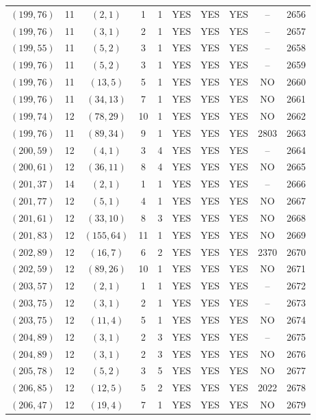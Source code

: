 \begin{longtable}{|c|c|c|c|c|c|c|c|c|c|}
$(199, 76)$ & 11 & $(2, 1)$ & 1 & 1 & YES & YES & YES & -- & 2656\\
$(199, 76)$ & 11 & $(3, 1)$ & 2 & 1 & YES & YES & YES & -- & 2657\\
$(199, 55)$ & 11 & $(5, 2)$ & 3 & 1 & YES & YES & YES & -- & 2658\\
$(199, 76)$ & 11 & $(5, 2)$ & 3 & 1 & YES & YES & YES & -- & 2659\\
$(199, 76)$ & 11 & $(13, 5)$ & 5 & 1 & YES & YES & YES & NO & 2660\\
$(199, 76)$ & 11 & $(34, 13)$ & 7 & 1 & YES & YES & YES & NO & 2661\\
$(199, 74)$ & 12 & $(78, 29)$ & 10 & 1 & YES & YES & YES & NO & 2662\\
$(199, 76)$ & 11 & $(89, 34)$ & 9 & 1 & YES & YES & YES & 2803 & 2663\\
$(200, 59)$ & 12 & $(4, 1)$ & 3 & 4 & YES & YES & YES & -- & 2664\\
$(200, 61)$ & 12 & $(36, 11)$ & 8 & 4 & YES & YES & YES & NO & 2665\\
$(201, 37)$ & 14 & $(2, 1)$ & 1 & 1 & YES & YES & YES & -- & 2666\\
$(201, 77)$ & 12 & $(5, 1)$ & 4 & 1 & YES & YES & YES & NO & 2667\\
$(201, 61)$ & 12 & $(33, 10)$ & 8 & 3 & YES & YES & YES & NO & 2668\\
$(201, 83)$ & 12 & $(155, 64)$ & 11 & 1 & YES & YES & YES & NO & 2669\\
$(202, 89)$ & 12 & $(16, 7)$ & 6 & 2 & YES & YES & YES & 2370 & 2670\\
$(202, 59)$ & 12 & $(89, 26)$ & 10 & 1 & YES & YES & YES & NO & 2671\\
$(203, 57)$ & 12 & $(2, 1)$ & 1 & 1 & YES & YES & YES & -- & 2672\\
$(203, 75)$ & 12 & $(3, 1)$ & 2 & 1 & YES & YES & YES & -- & 2673\\
$(203, 75)$ & 12 & $(11, 4)$ & 5 & 1 & YES & YES & YES & NO & 2674\\
$(204, 89)$ & 12 & $(3, 1)$ & 2 & 3 & YES & YES & YES & -- & 2675\\
$(204, 89)$ & 12 & $(3, 1)$ & 2 & 3 & YES & YES & YES & NO & 2676\\
$(205, 78)$ & 12 & $(5, 2)$ & 3 & 5 & YES & YES & YES & NO & 2677\\
$(206, 85)$ & 12 & $(12, 5)$ & 5 & 2 & YES & YES & YES & 2022 & 2678\\
$(206, 47)$ & 12 & $(19, 4)$ & 7 & 1 & YES & YES & YES & NO & 2679\\

\end{longtable}
